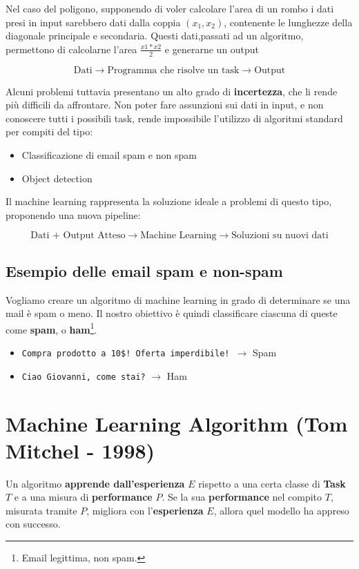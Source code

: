 Nel caso del poligono, supponendo di voler calcolare l'area di un rombo i dati presi in input sarebbero dati dalla coppia $(x_1,x_2)$, contenente le lunghezze della diagonale principale e secondaria.
Questi dati,passati ad un algoritmo, permettono di calcolarne l'area $\frac{x1*x2}{2}$ e generarne un output

$$
\text{Dati} \to \text{Programma che risolve un task} \to \text{Output}
$$

Alcuni problemi tuttavia presentano un alto grado di \textbf{incertezza}, che li rende più difficili da affrontare. Non poter fare assunzioni sui dati in input, e non conoscere tutti i possibili task, rende impossibile l'utilizzo di algoritmi standard per compiti del tipo:

\begin{itemize}
\item Classificazione di email spam e non spam
\item Object detection
\end{itemize}

Il machine learning rappresenta la soluzione ideale a problemi di questo tipo, proponendo una nuova pipeline:

$$
\text{Dati + Output Atteso} \to \text{Machine Learning} \to \text{Soluzioni su nuovi dati}
$$

\subsection{Esempio delle email spam e non-spam}

Vogliamo creare un algoritmo di machine learning in grado di determinare se una mail è spam o meno. Il nostro obiettivo è quindi classificare ciascuna di queste come \textbf{spam}, o \textbf{ham}\footnote{Email legittima, non spam.}.

\begin{itemize}
    \item \verb|Compra prodotto a 10$! Oferta imperdibile! |$\rightarrow$ Spam
    \item \verb|Ciao Giovanni, come stai?| $\rightarrow$ Ham
\end{itemize}

\section{Machine Learning Algorithm (Tom Mitchel - 1998)}

Un algoritmo \textbf{apprende dall'esperienza} $E$ rispetto a una certa classe di \textbf{Task} $T$ e a una misura di \textbf{performance} $P$. Se la sua \textbf{performance} nel compito $T$, misurata tramite $P$, migliora con l’\textbf{esperienza }$E$, allora quel modello ha appreso con successo.

